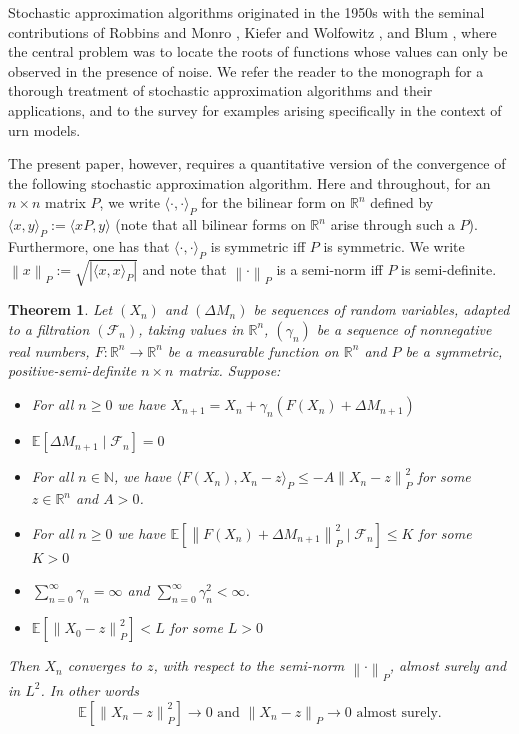\documentclass[12pt]{amsart}
\newtheorem{theorem}{Theorem}[section]
\theoremstyle{definition}
\theoremstyle{remark}
\newcommand{\norm}[1]{\left\lVert#1\right\rVert}
\newcommand{\NN}{\mathbb{N}}
\newcommand{\RR}{\mathbb{R}}
\newcommand{\EE}{\mathbb{E}}
\begin{document}
Stochastic approximation algorithms originated in the 1950s with the seminal contributions of Robbins and Monro \cite{Robbins1951}, Kiefer and Wolfowitz \cite{kiefer-wolfowitz:52:scheme}, and Blum \cite{blum:54:stochastic}, where the central problem was to locate the roots of functions whose values can only be observed in the presence of noise. We refer the reader to the monograph \cite{Duflo97} for a thorough treatment of stochastic approximation algorithms and their applications, and to the survey \cite{pemantle2007survey} for examples arising specifically in the context of urn models.

The present paper, however, requires a quantitative version of the convergence of the following stochastic approximation algorithm. Here and throughout, for an $n \times n$ matrix $P$, we write $\langle \cdot,\cdot\rangle_P$ for the bilinear form on $\RR^n$ defined by $\langle x,y\rangle_P:= \langle xP,y\rangle$ (note that all bilinear forms on $\RR^n$ arise through such a $P$). Furthermore, one has that $\langle \cdot,\cdot\rangle_P$ is symmetric iff $P$ is symmetric. We write $\norm{x}_P:= \sqrt{|\langle x,x\rangle_P|}$ and note that $\norm{\cdot}_P$ is a semi-norm iff $P$ is semi-definite.
\begin{theorem}
\label{thrm:RM}
Let $(X_n)$ and $(\Delta M_n)$ be sequences of random variables, adapted to a filtration $(\mathcal{F}_n)$, taking values in $\RR^n$, $(\gamma_n)$ be a sequence of nonnegative real numbers, $F: \RR^n \to \RR^n$ be a measurable function on $\RR^n$ and $P$ be a symmetric, positive-semi-definite $n \times n$ matrix. Suppose:
\begin{itemize}
    \item [(i)] For all $n \ge 0$ we have $ X_{n+1}= X_n + \gamma_{n}(F(X_n)+\Delta M_{n+1})$
    \item [(ii)] $\EE[\Delta M_{n+1}\mid \mathcal{F}_n]=0$
    \item[(iii)]  For all $n \in \NN$, we have $\langle F(X_n),X_n -z\rangle_P \le-A\norm{X_n -z}_P^2$ for some  $z \in \RR^n$ and $A > 0$.
    \item[(iv)] For all $n \ge 0$ we have $\EE[\norm{F(X_n)+\Delta M_{n+1}}_P^2 \mid \mathcal{F}_n] \le K$ for some $K>0$
    \item[(v)] $\sum_{n=0}^\infty \gamma_n = \infty$ and $\sum_{n=0}^\infty \gamma_n^2 < \infty$.
 \item [(vi)] $\EE[\norm{X_0 - z}_P^2] < L$ for some $L>0$
\end{itemize}
Then $X_n$ converges to $z$, with respect to the semi-norm $\norm{\cdot}_P$, almost surely and in $L^2$. In other words
\[
\EE\left[\norm{X_n-z}^2_P\right] \to 0 \mbox{ and } \norm{X_n-z}_P \to 0 \mbox{ almost surely.}
\]
\end{theorem}
\end{document}

